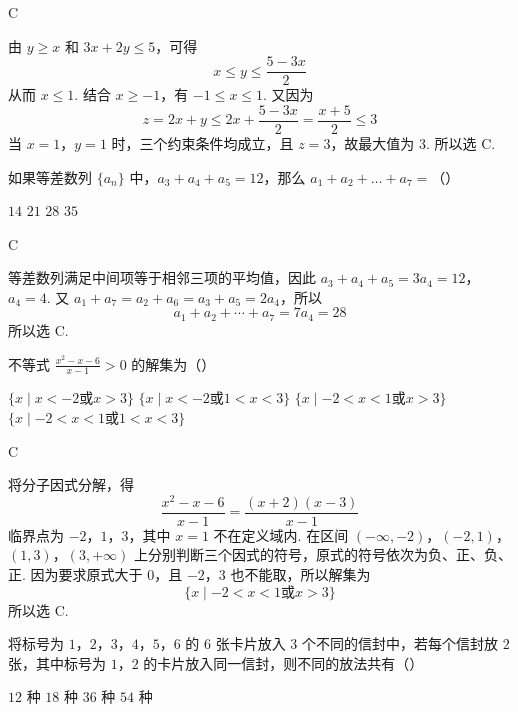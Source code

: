 \begin{answer}
C
\end{answer}

\begin{solution}
由 \(y\geqslant x\) 和 \(3x+2y\leqslant5\)，可得
\[
x\leqslant y\leqslant\frac{5-3x}{2}
\]
从而 \(x\leqslant1\). 结合 \(x\geqslant-1\)，有 \(-1\leqslant x\leqslant1\). 又因为
\[
z=2x+y\leqslant2x+\frac{5-3x}{2}=\frac{x+5}{2}\leqslant3
\]
当 \(x=1\)，\(y=1\) 时，三个约束条件均成立，且 \(z=3\)，故最大值为 \(3\). 所以选 C.
\end{solution}

\begin{problem}
如果等差数列 \(\{a_{n}\}\) 中，\(a_{3} + a_{4} + a_{5} = 12\)，那么 \(a_{1} + a_{2} + \dots + a_{7} =\)（\quad）

\choices
    {\(14\)}
    {\(21\)}
    {\(28\)}
    {\(35\)}
\end{problem}

\begin{answer}
C
\end{answer}

\begin{solution}
等差数列满足中间项等于相邻三项的平均值，因此
\(a_3+a_4+a_5=3a_4=12\)，\(a_4=4\).
又 \(a_1+a_7=a_2+a_6=a_3+a_5=2a_4\)，所以
\[
a_1+a_2+\cdots+a_7=7a_4=28
\]
所以选 C.
\end{solution}

\begin{problem}
不等式 \(\frac{x^2 - x - 6}{x - 1} > 0\) 的解集为（\quad）

\choices
    {\(\{x\mid x < -2 \text{或} x > 3\}\)}
    {\(\{x\mid x < -2 \text{或} 1 < x < 3\}\)}
    {\(\{x\mid -2 < x < 1 \text{或} x > 3\}\)}
    {\(\{x\mid -2 < x < 1 \text{或} 1 < x < 3\}\)}
\end{problem}

\begin{answer}
C
\end{answer}

\begin{solution}
将分子因式分解，得
\[
\frac{x^2-x-6}{x-1}=\frac{(x+2)(x-3)}{x-1}
\]
临界点为 \(-2\)，\(1\)，\(3\)，其中 \(x=1\) 不在定义域内. 在区间
\((-\infty,-2)\)，\((-2,1)\)，\((1,3)\)，\((3,+\infty)\)
上分别判断三个因式的符号，原式的符号依次为负、正、负、正. 因为要求原式大于 \(0\)，且 \(-2\)，\(3\) 也不能取，所以解集为
\[
\{x\mid -2<x<1\text{或}x>3\}
\]
所以选 C.
\end{solution}

\begin{problem}
将标号为 \(1\)，\(2\)，\(3\)，\(4\)，\(5\)，\(6\) 的 \(6\) 张卡片放入 \(3\) 个不同的信封中，若每个信封放 \(2\) 张，其中标号为 \(1\)，\(2\) 的卡片放入同一信封，则不同的放法共有（\quad）

\choices
    {\(12\text{ 种}\)}
    {\(18\text{ 种}\)}
    {\(36\text{ 种}\)}
    {\(54\text{ 种}\)}
\end{problem}

